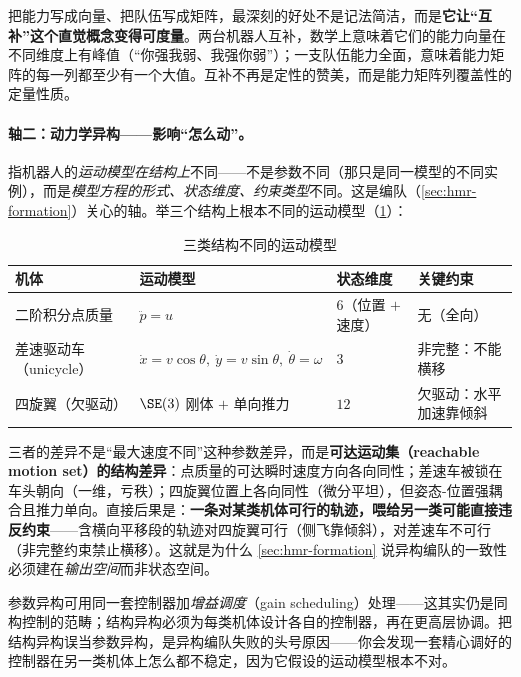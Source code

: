 \begin{insight}[互补 $=$ 能力矩阵列覆盖性的定量性质]
把能力写成向量、把队伍写成矩阵，最深刻的好处不是记法简洁，而是\textbf{它让“互补”这个直觉概念变得可度量}。两台机器人互补，数学上意味着它们的能力向量在不同维度上有峰值（“你强我弱、我强你弱”）；一支队伍能力全面，意味着能力矩阵的每一列都至少有一个大值。互补不再是定性的赞美，而是能力矩阵列覆盖性的定量性质。
\end{insight}

\paragraph{轴二：动力学异构——影响“怎么动”。}
指机器人的\emph{运动模型在结构上}不同——不是参数不同（那只是同一模型的不同实例），而是\emph{模型方程的形式、状态维度、约束类型}不同。这是编队（\cref{sec:hmr-formation}）关心的轴。举三个结构上根本不同的运动模型（\cref{tab:hmr-dynamics}）：
\begin{table}[H]\centering\small
\caption{三类结构不同的运动模型}
\label{tab:hmr-dynamics}
\begin{tabular}{llll}
\toprule
机体 & 运动模型 & 状态维度 & 关键约束 \\
\midrule
二阶积分点质量 & $\ddot{p}=u$ & $6$（位置 $+$ 速度） & 无（全向） \\
差速驱动车（unicycle） & $\dot x=v\cos\theta,\ \dot y=v\sin\theta,\ \dot\theta=\omega$ & $3$ & 非完整：不能横移 \\
四旋翼（欠驱动） & $\SE(3)$ 刚体 $+$ 单向推力 & $12$ & 欠驱动：水平加速靠倾斜 \\
\bottomrule
\end{tabular}
\end{table}
\noindent 三者的差异不是“最大速度不同”这种参数差异，而是\textbf{可达运动集（reachable motion set）的结构差异}：点质量的可达瞬时速度方向各向同性；差速车被锁在车头朝向（一维，亏秩）；四旋翼位置上各向同性（微分平坦），但姿态-位置强耦合且推力单向。直接后果是：\textbf{一条对某类机体可行的轨迹，喂给另一类可能直接违反约束}——含横向平移段的轨迹对四旋翼可行（侧飞靠倾斜），对差速车不可行（非完整约束禁止横移）。这就是为什么 \cref{sec:hmr-formation} 说异构编队的一致性必须建在\emph{输出空间}而非状态空间。

\begin{pitfall}
参数异构可用同一套控制器加\emph{增益调度}（gain scheduling）处理——这其实仍是同构控制的范畴；结构异构必须为每类机体设计各自的控制器，再在更高层协调。把结构异构误当参数异构，是异构编队失败的头号原因——你会发现一套精心调好的控制器在另一类机体上怎么都不稳定，因为它假设的运动模型根本不对。
\end{pitfall}


